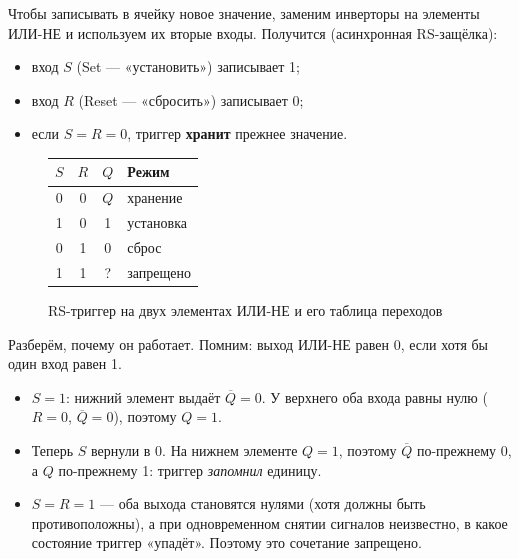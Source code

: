 Чтобы записывать в ячейку новое значение, заменим инверторы на элементы
ИЛИ-НЕ и используем их вторые входы. Получится 
(асинхронная RS-защёлка):
\begin{itemize}
  \item вход $S$ (Set --- «установить») записывает 1;
  \item вход $R$ (Reset --- «сбросить») записывает 0;
  \item если $S = R = 0$, триггер \textbf{хранит} прежнее значение.
\end{itemize}

\begin{figure}[H]
\centering
\begin{minipage}{0.48\textwidth}
\centering
{}
\end{minipage}\hfill
\begin{minipage}{0.48\textwidth}
\centering
\begin{tabular}{cc|c|l}
\toprule
$S$ & $R$ & $Q$ & \textbf{Режим} \\
\midrule
0 & 0 & $Q$ & хранение \\
1 & 0 & 1 & установка \\
0 & 1 & 0 & сброс \\
1 & 1 & \textcolor{FpgaRed}{?} & \textcolor{FpgaRed}{запрещено} \\
\bottomrule
\end{tabular}
\end{minipage}
\caption{RS-триггер на двух элементах ИЛИ-НЕ и его таблица переходов}
\label{fig:rs}
\end{figure}

Разберём, почему он работает. Помним: выход ИЛИ-НЕ равен 0, если хотя бы один
вход равен 1.
\begin{itemize}
  \item $S=1$: нижний элемент выдаёт $\overline{Q}=0$. У верхнего оба входа
        равны нулю ($R=0$, $\overline{Q}=0$), поэтому $Q=1$.
  \item Теперь $S$ вернули в 0. На нижнем элементе $Q=1$, поэтому
        $\overline{Q}$ по-прежнему 0, а $Q$ по-прежнему 1: триггер
        \emph{запомнил} единицу.
  \item $S=R=1$ --- оба выхода становятся нулями (хотя должны быть
        противоположны), а при одновременном снятии сигналов неизвестно, в
        какое состояние триггер «упадёт». Поэтому это сочетание запрещено.
\end{itemize}

